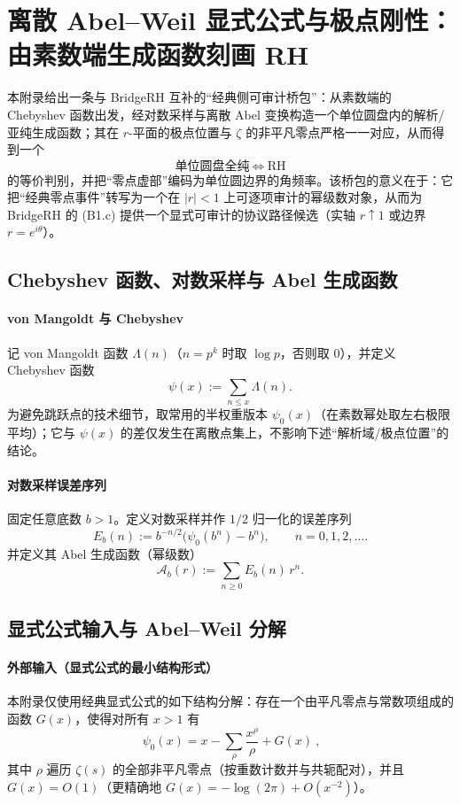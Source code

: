 \section{离散 Abel--Weil 显式公式与极点刚性：由素数端生成函数刻画 RH}\label{app:discrete-abel-weil}
本附录给出一条与 BridgeRH 互补的“经典侧可审计桥包”：从素数端的 Chebyshev 函数出发，经对数采样与离散 Abel 变换构造一个单位圆盘内的解析/亚纯生成函数；其在 $r$-平面的极点位置与 $\zeta$ 的非平凡零点严格一一对应，从而得到一个
$$
\text{单位圆盘全纯}\ \Longleftrightarrow\ \text{RH}
$$
的等价判别，并把“零点虚部”编码为单位圆边界的角频率。该桥包的意义在于：它把“经典零点事件”转写为一个在 $|r|<1$ 上可逐项审计的幂级数对象，从而为 BridgeRH 的 (B1.c) 提供一个显式可审计的协议路径候选（实轴 $r\uparrow 1$ 或边界 $r=e^{i\theta}$）。

\subsection{Chebyshev 函数、对数采样与 Abel 生成函数}
\label{subsec:abel-weil-setup}

\paragraph{von Mangoldt 与 Chebyshev}
记 von Mangoldt 函数 $\Lambda(n)$（$n=p^k$ 时取 $\log p$，否则取 $0$），并定义 Chebyshev 函数
$$
\psi(x):=\sum_{n\le x}\Lambda(n).
$$
为避免跳跃点的技术细节，取常用的半权重版本 $\psi_0(x)$（在素数幂处取左右极限平均）；它与 $\psi(x)$ 的差仅发生在离散点集上，不影响下述“解析域/极点位置”的结论。

\paragraph{对数采样误差序列}
固定任意底数 $b>1$。定义对数采样并作 $1/2$ 归一化的误差序列
$$
E_b(n):=b^{-n/2}\bigl(\psi_0(b^n)-b^n\bigr),\qquad n=0,1,2,\dots.
$$
并定义其 Abel 生成函数（幂级数）
$$
\mathcal A_b(r):=\sum_{n\ge 0}E_b(n)\,r^n.
$$

\subsection{显式公式输入与 Abel--Weil 分解}
\label{subsec:abel-weil-decomposition}

\paragraph{外部输入（显式公式的最小结构形式）}
本附录仅使用经典显式公式的如下结构分解：存在一个由平凡零点与常数项组成的函数 $G(x)$，使得对所有 $x>1$ 有
\begin{equation}\label{eq:psi0-explicit-schematic-bridge}
\boxed{\ \psi_0(x)=x-\sum_{\rho}\frac{x^\rho}{\rho}+G(x)\ },
\end{equation}
其中 $\rho$ 遍历 $\zeta(s)$ 的全部非平凡零点（按重数计数并与共轭配对），并且 $G(x)=O(1)$（更精确地 $G(x)=-\log(2\pi)+O(x^{-2})$）。

